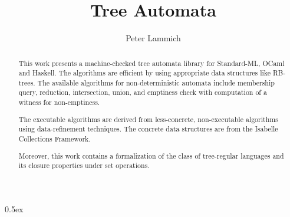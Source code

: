 \documentclass[11pt,a4paper]{article}
\begin{document}
\title{Tree Automata}
\author{Peter Lammich}
\maketitle

\begin{abstract}
  This work presents a machine-checked tree automata library for Standard-ML, OCaml and Haskell.
  The algorithms are efficient by using appropriate data structures like RB-trees.
  The available algorithms for non-deterministic automata include membership query, reduction, intersection,
  union, and emptiness check with computation of a witness for non-emptiness.
  
  The executable algorithms are derived from less-concrete, non-executable algorithms using
  data-refinement techniques. The concrete data structures are from the Isabelle Collections Framework.

  Moreover, this work contains a formalization of the class of tree-regular languages and its closure properties under set operations.
\end{abstract}

\clearpage

\tableofcontents

\clearpage

\parindent 0pt\parskip 0.5ex







\clearpage



\end{document}
